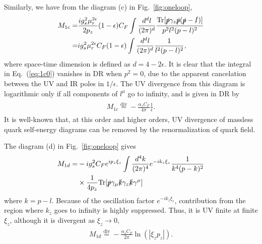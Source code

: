 \documentclass[twocolumn,aps,prd,superscriptaddress,nofootinbib,showpacs]{revtex4}
\begin{document}
Similarly, we have from the diagram (c) in Fig.~\ref{fig:oneloop},
\begin{align}\label{eq:1c0}
\begin{split}
M_{1c}=&\frac{i g_s^2 \mu_r^{2\epsilon}}{2p_z}(1-\epsilon)C_F\int\frac{d^dl}{(2\pi)^d} \frac{\text{Tr}[\slashed{p}\gamma_z {\slashed{p}}(\slashed{p}-\slashed{l})]}{p^2l^2(p-l)^2}\\
=&i g_s^2 \mu_r^{2\epsilon} C_F(1-\epsilon)\int\frac{d^dl}{(2\pi)^d} \frac{1}{l^2(p-l)^2},
\end{split}
\end{align}
where space-time dimension is defined as $d=4-2\epsilon$. It is clear that the integral in Eq.~(\ref{eq:1c0}) vanishes in DR when $p^2=0$, due to the apparent cancelation between the UV and IR poles in $1/\epsilon$.  The UV divergence from this diagram is logarithmic only if all components of $l^\mu$ go to infinity, and is given in DR by
\begin{align}\label{eq:1c}
\begin{split}
M_{1c}\overset{\text{div}}{=}-\frac{\alpha_s C_F}{4\pi} \frac{1}{\epsilon}.
\end{split}
\end{align}
It is well-known that, at this order and higher orders, UV divergence of massless quark self-energy diagrams can be removed by the renormalization of quark field.

The diagram (d) in Fig.~\ref{fig:oneloop} gives
\begin{align}
\begin{split}\label{eq:1d0}
M_{1d}=& -i g_s^2C_F e^{i p_z\xi_z} \int \frac{d^4k}{(2\pi)^4} e^{-ik_z \xi_z} \frac{1}{k^4 (p-k)^2} \\
&\times \frac{1}{4p_z } \text{Tr}[\slashed{p}\gamma_\mu\slashed{k}\gamma_z\slashed{k}\gamma^\mu]
\end{split}
\end{align}
where $k=p-l$.
Because of the oscillation factor $e^{-ik_z \xi_z}$, contribution from the region where $k_z$ goes to infinity is highly suppressed. Thus, it is UV finite at finite $\xi_z$, although it is divergent as $\xi_z \to 0$,
\begin{align}\label{eq:1d}
\begin{split}
M_{1d}\overset{\text{div}}{=}-\frac{\alpha_s C_F}{2\pi} \ln(|\xi_zp_z|).
\end{split}
\end{align}
\end{document}
